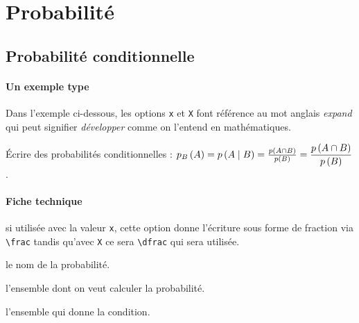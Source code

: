 \documentclass[12pt,a4paper]{article}
\begin{document}
\section{Probabilité}

\subsection{Probabilité conditionnelle}

			\paragraph{Un exemple type}

Dans l'exemple ci-dessous, les options \texttt{x} et \texttt{X} font référence au mot anglais \emph{\og expand \fg} qui peut signifier \emph{\og développer \fg} comme on l'entend en mathématiques.

\begin{tcblisting}{}
Écrire des probabilités conditionnelles :
$\probacond{p}{A}{B} = \probacond*{p}{A}{B}
                     = \probacond[x]{p}{A}{B}
                     = \probacond[X]{p}{A}{B}$.
\end{tcblisting}


\paragraph{Fiche technique}



\IDoption{} si utilisée avec la valeur \verb+x+, cette option donne l'écriture sous forme de fraction via \verb+\frac+ tandis qu'avec \verb+X+ ce sera \verb+\dfrac+ qui sera utilisée.

 le nom de la probabilité.

 l'ensemble dont on veut calculer la probabilité.

 l'ensemble qui donne la condition.
\end{document}
